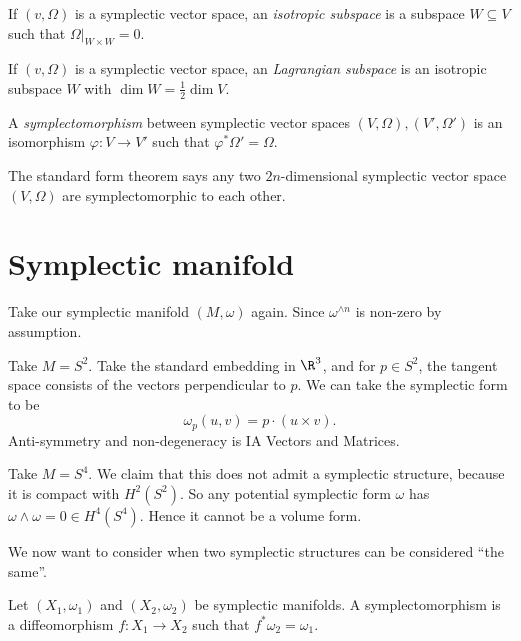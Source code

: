 \documentclass[a4paper]{article}
\begin{document}
\begin{defi}
  If $(v, \Omega)$ is a symplectic vector space, an \emph{isotropic subspace} is a subspace $W \subseteq V$ such that $\Omega|_{W \times W} = 0$.
\end{defi}

\begin{defi}
  If $(v, \Omega)$ is a symplectic vector space, an \emph{Lagrangian subspace} is an isotropic subspace $W$ with $\dim W = \frac{1}{2} \dim V$.
\end{defi}

\begin{defi}[Symplectomorphism]
  A \emph{symplectomorphism} between symplectic vector spaces $(V, \Omega), (V', \Omega')$ is an isomorphism $\varphi: V \to V'$ such that $\varphi^* \Omega' = \Omega$.
\end{defi}

The standard form theorem says any two $2n$-dimensional symplectic vector space $(V, \Omega)$ are symplectomorphic to each other.

\section{Symplectic manifold}
Take our symplectic manifold $(M, \omega)$ again. Since $\omega^{\wedge n}$ is non-zero by assumption.

\begin{eg}
  Take $M = S^2$. Take the standard embedding in $\R^3$, and for $p \in S^2$, the tangent space consists of the vectors perpendicular to $p$. We can take the symplectic form to be
  \[
    \omega_p(u, v) = p \cdot (u \times v).
  \]
  Anti-symmetry and non-degeneracy is IA Vectors and Matrices.
\end{eg}

\begin{eg}
  Take $M = S^4$. We claim that this does not admit a symplectic structure, because it is compact with $H^2(S^2)$. So any potential symplectic form $\omega$ has $\omega \wedge \omega = 0 \in H^4(S^4)$. Hence it cannot be a volume form.
\end{eg}

We now want to consider when two symplectic structures can be considered ``the same''.
\begin{defi}[Symplectomorphism]
  Let $(X_1, \omega_1)$ and $(X_2, \omega_2)$ be symplectic manifolds. A symplectomorphism is a diffeomorphism $f: X_1 \to X_2$ such that $f^* \omega_2 = \omega_1$.
\end{defi}
\end{document}
